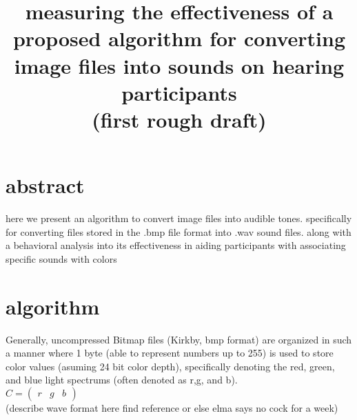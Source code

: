 \documentclass[]{article}
\title{measuring the effectiveness of a proposed algorithm for converting image files into sounds on hearing participants \\(first rough draft)}
\begin{document}
\maketitle
\section{abstract}
here we present an algorithm to convert image files into audible tones. specifically for converting files stored in the .bmp file format into .wav sound files.
along with a behavioral analysis into its effectiveness in aiding participants with associating specific sounds with colors
\section{algorithm}
Generally, uncompressed Bitmap files (Kirkby, bmp format) are organized in such a manner where 1 byte (able to represent numbers up to 255) 
is used to store color values (asuming 24 bit color depth), specifically denoting the red, green, and blue light spectrums (often denoted as r,g, and b). 
\\
\begin{math}
    C = \begin{pmatrix}
            r & g & b
        \end{pmatrix}
\end{math}
\\

(describe wave format here find reference or else elma says no cock for a week)
\end{document}
